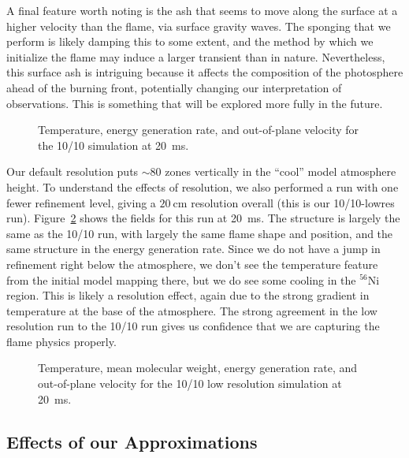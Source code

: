 \documentclass[trackchanges,preprint,times,tighten]{aastex63}
\newcommand{\isot}[2]{$^{#2}\mathrm{#1}$}
\begin{document}
A final feature worth noting is the ash that seems to move along the
surface at a higher velocity than the flame, via surface gravity
waves.  The sponging that we perform is likely damping this to some extent, and
the method by which we initialize the flame may induce a larger
transient than in nature. Nevertheless, this surface ash is intriguing
because it affects the composition of the photosphere ahead of the
burning front, potentially changing our interpretation of
observations.  This is something that will be explored more fully in
the future.

\begin{figure}[t]
\centering
{}
\caption{\label{fig:10_10_overview} Temperature, energy generation rate, and out-of-plane velocity for the 10/10 simulation at 20~ms.}
\end{figure}


Our default resolution puts $\sim 80$ zones vertically in the
``cool''  model atmosphere height.  To
understand the effects of resolution, we also performed a run with one
fewer refinement level, giving a $20~\mbox{cm}$ resolution overall (this is our
10/10-lowres run).  Figure~\ref{fig:10_10_lowres} shows the fields for this run at
20~ms.  The structure is largely the same as the 10/10 run, with
largely the same flame shape and position, and the same structure in
the energy generation rate.  Since we do not have a jump in refinement
right below the atmosphere, we don't see the temperature feature from
the initial model mapping there, but we do see some cooling in the
\isot{Ni}{56} region.  This is likely a resolution effect, again due
to the strong gradient in temperature at the base of the atmosphere.
The strong agreement in the low resolution run to the 10/10 run gives
us confidence that we are capturing the flame physics properly.

\begin{figure}[t]
\centering
{}
\caption{\label{fig:10_10_lowres} Temperature, mean molecular weight,
  energy generation rate, and out-of-plane velocity for the 10/10 low
  resolution simulation at 20~ms.}
\end{figure}




\subsection{Effects of our Approximations}
\end{document}
